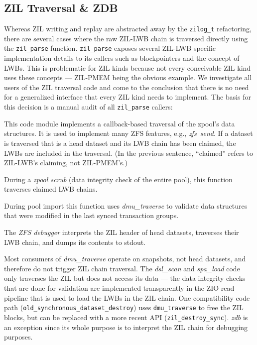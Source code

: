 \documentclass[12pt,a4paper,twoside]{book}
\begin{document}
\subsection{ZIL Traversal \& ZDB}\label{sec:zil_kinds:traversal}
Whereas ZIL writing and replay are abstracted away by the \lstinline{zilog_t} refactoring, there are several cases where the raw ZIL-LWB chain is traversed directly using the \lstinline{zil_parse} function.
\lstinline{zil_parse} exposes several ZIL-LWB specific implementation details to its callers such as blockpointers and the concept of LWBs.
This is problematic for ZIL kinds because not every conceivable ZIL kind uses these concepts --- ZIL-PMEM being the obvious example.
We investigate all users of the ZIL traversal code and come to the conclusion that there is no need for a generalized interface that every ZIL kind needs to implement.
The basis for this decision is a manual audit of all \lstinline{zil_parse} callers:
\begin{description}[noitemsep]
    \item[dmu\_traverse] This code module implements a callback-based traversal of the zpool's data structures.
    It is used to implement many ZFS features, e.g., \mbox{\textit{zfs send}}.
    If a dataset is traversed that is a head dataset and its LWB chain has been claimed, the LWBs are included in the traversal.
    (In the previous sentence, ``claimed'' refers to ZIL-LWB's claiming, not ZIL-PMEM's.)
    \item[dsl\_scan\_zil] During a \textit{zpool scrub} (data integrity check of the entire pool), this function traverses claimed LWB chains.
    \item[spa\_load\_verify] During pool import this function uses \textit{dmu\_traverse} to validate data structures that were modified in the last synced transaction groups.
    \item[zdb\_il.c] The \textit{ZFS debugger} interprets the ZIL header of head datasets, traverses their LWB chain, and dumps its contents to stdout.
\end{description}
Most consumers of \textit{dmu\_traverse} operate on snapshots, not head datasets, and therefore do not trigger ZIL chain traversal.
The \textit{dsl\_scan} and \textit{spa\_load} code only traverses the ZIL but does not access its data --- the data integrity checks that are done for validation are implemented transparently in the ZIO read pipeline that is used to load the LWBs in the ZIL chain.
One compatibility code path (\lstinline{old_synchronous_dataset_destroy}) uses \lstinline{dmu_traverse} to free the ZIL blocks, but can be replaced with a more recent API (\lstinline{zil_destroy_sync}).
\textit{zdb} is an exception since its whole purpose is to interpret the ZIL chain for debugging purposes.
\end{document}
